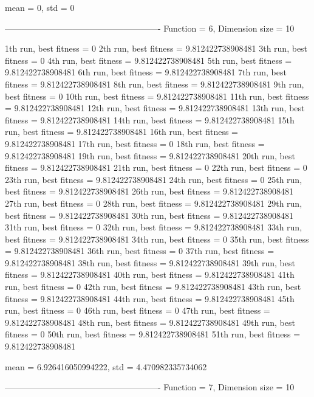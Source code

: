 mean = 0, std = 0

-------------------------------------------------------
Function = 6, Dimension size = 10

1th run, best fitness = 0
2th run, best fitness = 9.812422738908481
3th run, best fitness = 0
4th run, best fitness = 9.812422738908481
5th run, best fitness = 9.812422738908481
6th run, best fitness = 9.812422738908481
7th run, best fitness = 9.812422738908481
8th run, best fitness = 9.812422738908481
9th run, best fitness = 0
10th run, best fitness = 9.812422738908481
11th run, best fitness = 9.812422738908481
12th run, best fitness = 9.812422738908481
13th run, best fitness = 9.812422738908481
14th run, best fitness = 9.812422738908481
15th run, best fitness = 9.812422738908481
16th run, best fitness = 9.812422738908481
17th run, best fitness = 0
18th run, best fitness = 9.812422738908481
19th run, best fitness = 9.812422738908481
20th run, best fitness = 9.812422738908481
21th run, best fitness = 0
22th run, best fitness = 0
23th run, best fitness = 9.812422738908481
24th run, best fitness = 0
25th run, best fitness = 9.812422738908481
26th run, best fitness = 9.812422738908481
27th run, best fitness = 0
28th run, best fitness = 9.812422738908481
29th run, best fitness = 9.812422738908481
30th run, best fitness = 9.812422738908481
31th run, best fitness = 0
32th run, best fitness = 9.812422738908481
33th run, best fitness = 9.812422738908481
34th run, best fitness = 0
35th run, best fitness = 9.812422738908481
36th run, best fitness = 0
37th run, best fitness = 9.812422738908481
38th run, best fitness = 9.812422738908481
39th run, best fitness = 9.812422738908481
40th run, best fitness = 9.812422738908481
41th run, best fitness = 0
42th run, best fitness = 9.812422738908481
43th run, best fitness = 9.812422738908481
44th run, best fitness = 9.812422738908481
45th run, best fitness = 0
46th run, best fitness = 0
47th run, best fitness = 9.812422738908481
48th run, best fitness = 9.812422738908481
49th run, best fitness = 0
50th run, best fitness = 9.812422738908481
51th run, best fitness = 9.812422738908481

mean = 6.926416050994222, std = 4.470982335734062

-------------------------------------------------------
Function = 7, Dimension size = 10

